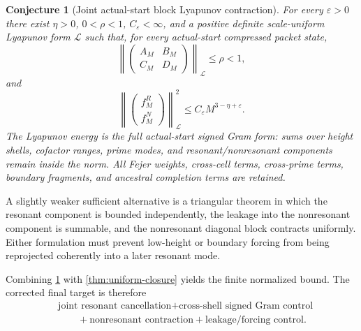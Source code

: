 \documentclass[11pt]{article}
\newtheorem{conjecture}[theorem]{Conjecture}
\theoremstyle{definition}
\theoremstyle{remark}
\newcommand{\eps}{\varepsilon}
\newcommand{\1}{\mathbf{1}}
\newcommand{\C}{\mathbb{C}}
\begin{document}
\begin{conjecture}[Joint actual-start block Lyapunov contraction]
\label{conj:corrected-fixed-packet-frame}
For every $\eps>0$ there exist $\eta>0$, $0<\rho<1$, $C_\eps<\infty$, and a
positive definite scale-uniform Lyapunov form $\mathcal L$ such that, for every
actual-start compressed packet state,
\begin{equation}
 \boxed{
 \left\|
 \begin{pmatrix}A_M&B_M\\C_M&D_M\end{pmatrix}
 \right\|_{\mathcal L}
 \le\rho<1,
 }
 \label{eq:block-Lyapunov-contraction}
\end{equation}
and
\begin{equation}
 \boxed{
 \left\|\begin{pmatrix}f_M^R\\f_M^N\end{pmatrix}\right\|_{\mathcal L}^2
 \le C_\eps M^{3-\eta+\eps}.
 }
 \label{eq:block-forcing-bound}
\end{equation}
The Lyapunov energy is the full actual-start signed Gram form: sums over height
shells, cofactor ranges, prime modes, and resonant/nonresonant components remain
inside the norm.  All Fejer weights, cross-cell terms, cross-prime terms, boundary
fragments, and ancestral completion terms are retained.
\end{conjecture}

A slightly weaker sufficient alternative is a triangular theorem in which the
resonant component is bounded independently, the leakage into the nonresonant
component is summable, and the nonresonant diagonal block contracts uniformly.
Either formulation must prevent low-height or boundary forcing from being
reprojected coherently into a later resonant mode.

Combining \cref{conj:corrected-fixed-packet-frame} with
\cref{thm:uniform-closure} yields the finite normalized bound.  The corrected final
target is therefore
\begin{equation}
 \boxed{
 \begin{aligned}
 &\text{joint resonant cancellation}
 +\text{cross-shell signed Gram control}\\
 &\qquad
 +\text{nonresonant contraction}
 +\text{leakage/forcing control}.
 \end{aligned}
 }
 \label{eq:final-two-part-target}
\end{equation}

\end{document}

